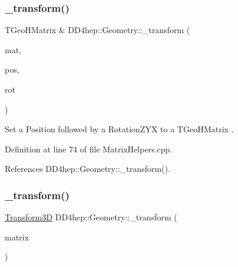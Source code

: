 \subsubsection{\texorpdfstring{\+\_\+transform()}{\_transform()}\hspace{0.1cm}{\footnotesize\ttfamily [10/11]}}
{\footnotesize\ttfamily T\+Geo\+H\+Matrix \& D\+D4hep\+::\+Geometry\+::\+\_\+transform (\begin{DoxyParamCaption}\item[{T\+Geo\+H\+Matrix \&}]{mat,  }\item[{const \hyperlink{namespace_d_d4hep_1_1_geometry_a55083902099d03506c6db01b80404900}{Geometry\+::\+Position} \&}]{pos,  }\item[{const \hyperlink{namespace_d_d4hep_1_1_geometry_a24667b2b9c3cec3d5239828db4d52189}{Geometry\+::\+Rotation\+Z\+YX} \&}]{rot }\end{DoxyParamCaption})}



Set a Position followed by a Rotation\+Z\+YX to a T\+Geo\+H\+Matrix . 



Definition at line 74 of file Matrix\+Helpers.\+cpp.



References D\+D4hep\+::\+Geometry\+::\+\_\+transform().

\hypertarget{group___d_d4_h_e_p___g_e_o_m_e_t_r_y_ga7d9b7297bf0cee38d702a6e460a030a1}{}\label{group___d_d4_h_e_p___g_e_o_m_e_t_r_y_ga7d9b7297bf0cee38d702a6e460a030a1} 
\subsubsection{\texorpdfstring{\+\_\+transform()}{\_transform()}\hspace{0.1cm}{\footnotesize\ttfamily [11/11]}}
{\footnotesize\ttfamily \hyperlink{namespace_d_d4hep_1_1_geometry_aeb4c0356d12fd7be49a0aae50514e64b}{Transform3D} D\+D4hep\+::\+Geometry\+::\+\_\+transform (\begin{DoxyParamCaption}\item[{const T\+Geo\+Matrix $\ast$}]{matrix }\end{DoxyParamCaption})}




